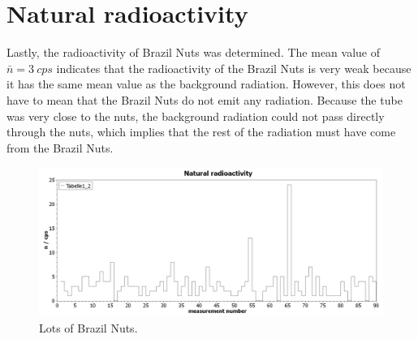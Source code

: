 \section{Natural radioactivity}
%
Lastly, the radioactivity of Brazil Nuts was determined. The mean value of \( \bar{n}=\SI{3}{cps} \) indicates that the
radioactivity of the Brazil Nuts is very weak because it has the same mean value as the background radiation. However,
this does not have to mean that the Brazil Nuts do not emit any radiation. Because the tube was very close to the nuts,
the background radiation could not pass directly through the nuts, which implies that the rest of the radiation must have
come from the Brazil Nuts.
\begin{figure}[H]
 \centering
 \includegraphics[width=.9\textwidth]{scidavis/Fig.12_Natural radioactivity.jpg}
 \caption[Brazil Nutz]{Lots of Brazil Nuts.}
 \label{fig:brazilNutz}
\end{figure}